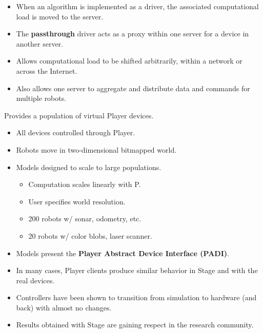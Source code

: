 \documentclass[30pt,landscape,magscalefonts]{foils}
\newcommand{\foilheadc}[1]{\foilhead{\Large \textcolor{myred}{#1}}\vspace*{-2em}}
\newenvironment{xitemize}{\begin{itemize} \itemsep 1pt}{\end{itemize}}
\begin{document}
\foilheadc{Shifting the computation}
\begin{xitemize}
\item When an algorithm is implemented as a driver, the associated
computational load is moved to the server.
\item The {\bf passthrough} driver acts as a proxy within one server
for a device in another server.
\item Allows computational load to be shifted arbitrarily, within a
network or across the Internet.
\item Also allows one server to aggregate and distribute data and
commands for multiple robots.
\end{xitemize}


\foilheadc{Stage: a multi-robot simulator}
Provides a population of virtual Player devices.
\begin{xitemize}
\item All devices controlled through Player.
\item Robots move in two-dimensional bitmapped world.
\item Models designed to scale to large populations.
{\small
\begin{itemize}
\item Computation scales linearly with P.
\item User specifies world resolution.
\item 200 robots w/ sonar, odometry, etc.
\item 20 robots w/ color blobs, laser scanner.
\end{itemize}
}
\end{xitemize}

\foilheadc{Stage (cont'd)}
\begin{xitemize}
\item Models present the {\bf Player Abstract Device Interface (PADI)}.
\item In many cases, Player clients produce similar behavior in Stage and with
the real devices.
\item Controllers have been shown to transition from simulation to hardware
(and back) with almost no changes.
\item Results obtained with Stage are gaining respect in the research
community.
\end{xitemize}
\end{document}
